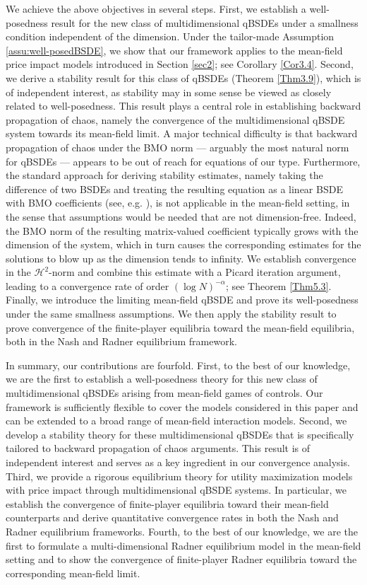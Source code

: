 \documentclass[10pt,a4paper]{article}
\newcommand{\MH}{{\mathcal{H}}}
\theoremstyle{plain}
\theoremstyle{definition}
\numberwithin{equation}{section}
\begin{document}
We achieve the above objectives in several steps. First, we establish a well-posedness result for the new class of multidimensional qBSDEs under a smallness condition independent of the dimension. Under the tailor-made Assumption \ref{assu:well-posedBSDE}, we show that our framework applies to the mean-field price impact models introduced in Section \ref{sec2}; see Corollary \ref{Cor3.4}. Second, we derive a stability result for this class of qBSDEs (Theorem \ref{Thm3.9}),  which is of independent interest, as stability may in some sense be viewed as closely related to well-posedness. This result plays a central role in establishing backward propagation of chaos, namely the convergence of the multidimensional qBSDE system towards its mean-field limit. A major technical difficulty is that backward propagation of chaos under the BMO norm --- arguably the most natural norm for qBSDEs --- appears to be out of reach for equations of our type. Furthermore, the standard approach for deriving stability estimates, namely taking the difference of two BSDEs and treating the resulting equation as a linear BSDE with BMO coefficients (see, e.g. \cite{Jack23}), is not applicable in the mean-field setting, in the sense that assumptions would be needed that are not dimension-free. Indeed, the BMO norm of the resulting matrix-valued coefficient typically grows with the dimension of the system, which in turn causes the corresponding estimates for the solutions to blow up as the dimension tends to infinity. We  establish convergence in the \(\MH^2\)-norm and combine this estimate with a Picard iteration argument, leading to a convergence rate of order \((\log N)^{-\alpha}\); see Theorem \ref{Thm5.3}. Finally, we introduce the limiting mean-field qBSDE and prove its well-posedness under the same smallness assumptions. We then apply the stability result to prove convergence of the finite-player equilibria toward the mean-field equilibria, both in the Nash and Radner equilibrium framework.



In summary, our contributions are fourfold.
First, to the best of our knowledge, we are the first to establish a well-posedness theory for this new class of multidimensional qBSDEs arising from mean-field games of controls. Our framework is sufficiently flexible to cover the models considered in this paper and can be extended to a broad range of mean-field interaction models.
Second, we develop a stability theory for these multidimensional qBSDEs that is specifically tailored to backward propagation of chaos arguments. This result is of independent interest and serves as a key ingredient in our convergence analysis.
Third, we provide a rigorous equilibrium theory for utility maximization models with price impact through multidimensional qBSDE systems. In particular, we establish the convergence of finite-player equilibria toward their mean-field counterparts and derive quantitative convergence rates in both the Nash and Radner equilibrium frameworks. Fourth, to the best of our knowledge, we are the first to formulate a multi-dimensional Radner equilibrium model in the mean-field setting and to show the convergence of finite-player Radner equilibria toward the corresponding mean-field limit.
\end{document}
